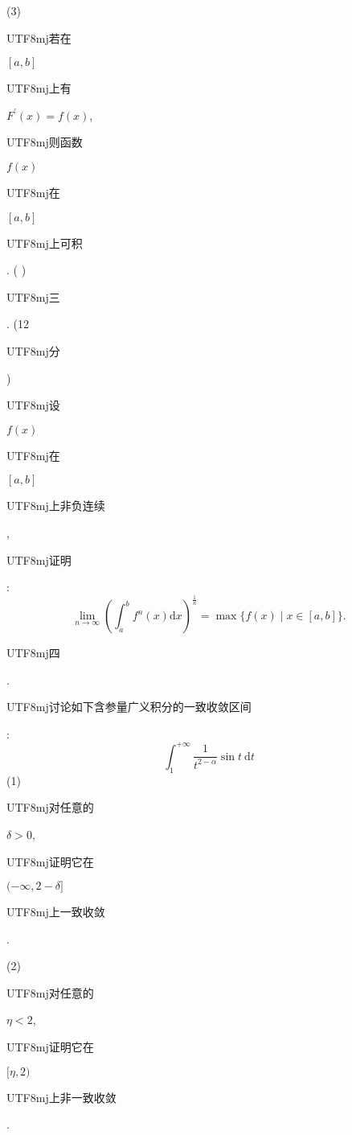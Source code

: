 \documentclass[10pt]{article}
\begin{document}
(3) \begin{CJK}{UTF8}{mj}若在\end{CJK} $[a, b]$ \begin{CJK}{UTF8}{mj}上有\end{CJK} $F^{\prime}(x)=f(x)$, \begin{CJK}{UTF8}{mj}则函数\end{CJK} $f(x)$ \begin{CJK}{UTF8}{mj}在\end{CJK} $[a, b]$ \begin{CJK}{UTF8}{mj}上可积\end{CJK}. ( )

\begin{CJK}{UTF8}{mj}三\end{CJK}. (12 \begin{CJK}{UTF8}{mj}分\end{CJK}) \begin{CJK}{UTF8}{mj}设\end{CJK} $f(x)$ \begin{CJK}{UTF8}{mj}在\end{CJK} $[a, b]$ \begin{CJK}{UTF8}{mj}上非负连续\end{CJK}, \begin{CJK}{UTF8}{mj}证明\end{CJK}:
$$
\lim _{n \rightarrow \infty}\left(\int_{a}^{b} f^{n}(x) \mathrm{d} x\right)^{\frac{1}{n}}=\max \{f(x) \mid x \in[a, b]\} .
$$
\begin{CJK}{UTF8}{mj}四\end{CJK}. \begin{CJK}{UTF8}{mj}讨论如下含参量广义积分的一致收敛区间\end{CJK}:
$$
\int_{1}^{+\infty} \frac{1}{t^{2-\alpha}} \sin t \mathrm{~d} t
$$
(1) \begin{CJK}{UTF8}{mj}对任意的\end{CJK} $\delta>0$, \begin{CJK}{UTF8}{mj}证明它在\end{CJK} $(-\infty, 2-\delta]$ \begin{CJK}{UTF8}{mj}上一致收敛\end{CJK}.

(2) \begin{CJK}{UTF8}{mj}对任意的\end{CJK} $\eta<2$, \begin{CJK}{UTF8}{mj}证明它在\end{CJK} $[\eta, 2)$ \begin{CJK}{UTF8}{mj}上非一致收敛\end{CJK}.
\end{document}
